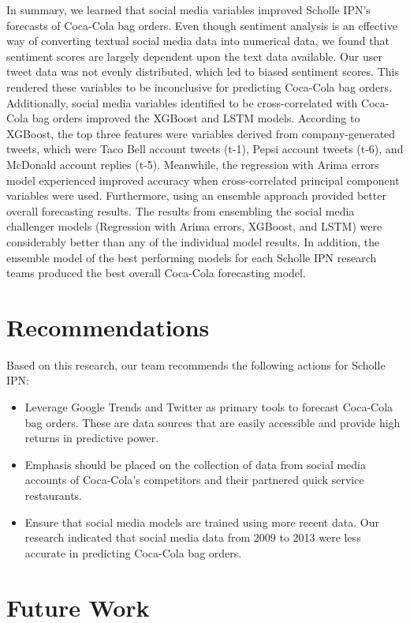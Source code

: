 \documentclass[12pt,oneside]{chicagocapstone}
\begin{document}
In summary, we learned that social media variables improved Scholle IPN's forecasts of Coca-Cola bag orders. Even though sentiment analysis is an effective way of converting textual social media data into numerical data, we found that sentiment scores are largely dependent upon the text data available. Our user tweet data was not evenly distributed, which led to biased sentiment scores. This rendered these variables to be inconclusive for predicting Coca-Cola bag orders. Additionally, social media variables identified to be cross-correlated with Coca-Cola bag orders improved the XGBoost and LSTM models. According to XGBoost, the top three features were variables derived from company-generated tweets, which were Taco Bell account tweets (t-1), Pepsi account tweets (t-6), and McDonald account replies (t-5). Meanwhile, the regression with Arima errors model experienced improved accuracy when cross-correlated principal component variables were used. Furthermore, using an ensemble approach provided better overall forecasting results. The results from ensembling the social media challenger models (Regression with Arima errors, XGBoost, and LSTM) were considerably better than any of the individual model results. In addition, the ensemble model of the best performing models for each Scholle IPN research teams produced the best overall Coca-Cola forecasting model.

\hypertarget{recommendations}{%
\chapter*{Recommendations}\label{recommendations}}

Based on this research, our team recommends the following actions for Scholle IPN:
\begin{itemize}
\item
  Leverage Google Trends and Twitter as primary tools to forecast Coca-Cola bag orders. These are data sources that are easily accessible and provide high returns in predictive power.
\item
  Emphasis should be placed on the collection of data from social media accounts of Coca-Cola's competitors and their partnered quick service restaurants.
\item
  Ensure that social media models are trained using more recent data. Our research indicated that social media data from 2009 to 2013 were less accurate in predicting Coca-Cola bag orders.
\end{itemize}
\hypertarget{future-work}{%
\chapter*{Future Work}\label{future-work}}
\end{document}
